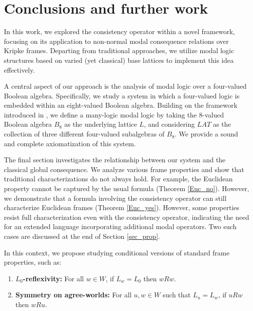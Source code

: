 \documentclass{amsart}
\begin{document}
\section{Conclusions and further work}

In this work, we explored the consistency operator within a novel framework, focusing on its application to non-normal modal consequence relations over Kripke frames. Departing from traditional approaches, we utilize modal logic structures based on varied (yet classical) base lattices to implement this idea effectively.

A central aspect of our approach is the analysis of modal logic over a four-valued Boolean algebra. Specifically, we study a system in which a four-valued logic is embedded within an eight-valued Boolean algebra. Building on the framework introduced in \cite{freire_modality_2024}, we define a many-logic modal logic by taking the $8$-valued Boolean algebra $B_8$ as the underlying lattice $L$, and considering $LAT$ as the collection of three different four-valued subalgebras of $B_8$. We provide a sound and complete axiomatization of this system.

The final section investigates the relationship between our system and the classical global consequence. We analyze various frame properties and show that traditional characterizations do not always hold. For example, the Euclidean property cannot be captured by the usual formula (Theorem \ref{Euc_no}). However, we demonstrate that a formula involving the consistency operator can still characterize Euclidean frames (Theorem \ref{Euc_yes}). However, some properties resist full characterization even with the consistency operator, indicating the need for an extended language incorporating additional modal operators. Two such cases are discussed at the end of Section \ref{sec_prop}.

In this context, we propose studying conditional versions of standard frame properties, such as:

\begin{enumerate} 
\item \textbf{$L_0$-reflexivity:} For all $w \in W$, if $L_w = L_0$ then $w R w$. 
\item \textbf{Symmetry on agree-worlds:} For all $u, w \in W$ such that $L_u = L_w$, if $u R w$ then $w R u$. 
\end{enumerate}
\end{document}
